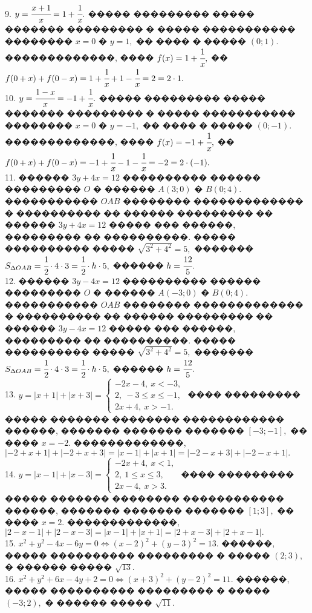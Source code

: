 \documentclass[12pt]{article}
\begin{document}
9. $y=\cfrac{x+1}{x}=1+\cfrac{1}{x}.$ ����� ��������� ����� ������� ��������� � ����� ����������� �������� $x=0$ � $y=1,$ �� ���� � ����� $(0;1).$ �������������, ���� $f(x)=1+\cfrac{1}{x},$ �� $f(0+x)+f(0-x)=1+\cfrac{1}{x}+1-\cfrac{1}{x}=2=2\cdot1.$\\
10. $y=\cfrac{1-x}{x}=-1+\cfrac{1}{x}.$ ����� ��������� ����� ������� ��������� � ����� ����������� �������� $x=0$ � $y=-1,$ �� ���� � ����� $(0;-1).$ �������������, ���� $f(x)=-1+\cfrac{1}{x},$ �� $f(0+x)+f(0-x)=-1+\cfrac{1}{x}-1-\cfrac{1}{x}=-2=2\cdot(-1).$\\
11. ������ $3y+4x=12$ ���������� ������ ��������� $O$ � ������ $A(3;0)$ � $B(0;4).$ ����������� $OAB$ �������� ������������� � ���������� �� ������ ��������� �� ������ $3y+4x=12$ ����� ��� ������, ��������� �� ����������. ����� ���������� ����� $\sqrt{3^2+4^2}=5,$ ������� $S_{\Delta OAB}=\cfrac{1}{2}\cdot4\cdot3=\cfrac{1}{2}\cdot h\cdot5,$ ������ $h=\cfrac{12}{5}.$\\
12. ������ $3y-4x=12$ ���������� ������ ��������� $O$ � ������ $A(-3;0)$ � $B(0;4).$ ����������� $OAB$ �������� ������������� � ���������� �� ������ ��������� �� ������ $3y-4x=12$ ����� ��� ������, ��������� �� ����������. ����� ���������� ����� $\sqrt{3^2+4^2}=5,$ ������� $S_{\Delta OAB}=\cfrac{1}{2}\cdot4\cdot3=\cfrac{1}{2}\cdot h\cdot5,$ ������ $h=\cfrac{12}{5}.$\\
13. $y=|x+1|+|x+3|=\begin{cases}-2x-4,\ x<-3,\\ 2,\ -3\leqslant x\leqslant -1,\\ 2x+4,\ x>-1.\end{cases}$ ���� ��������� ����� ������� �������� ������������ ������, ������� ������� ������� $[-3;-1],$ �� ���� $x=-2.$ �������������, $|-2+x+1|+|-2+x+3|=|x-1|+|x+1|=|-2-x+3|+|-2-x+1|.$\\
14. $y=|x-1|+|x-3|=\begin{cases}-2x+4,\ x<1,\\ 2,\ 1\leqslant x\leqslant 3,\\ 2x-4,\ x>3.\end{cases}$ ���� ��������� ����� ������� �������� ������������ ������, ������� ������� ������� $[1;3],$ �� ���� $x=2.$ �������������, $|2-x-1|+|2-x-3|=|x-1|+|x+1|=|2+x-3|+|2+x-1|.$\\
15. $x^2+y^2-4x-6y=0\Leftrightarrow (x-2)^2+(y-3)^2=13.$ ������, ����� ���������� ��������� � ����� $(2;3),$ � ������ ����� $\sqrt{13}.$\\
16. $x^2+y^2+6x-4y+2=0\Leftrightarrow (x+3)^2+(y-2)^2=11.$ ������, ����� ���������� ��������� � ����� $(-3;2),$ � ������ ����� $\sqrt{11}.$\\
\end{document}
